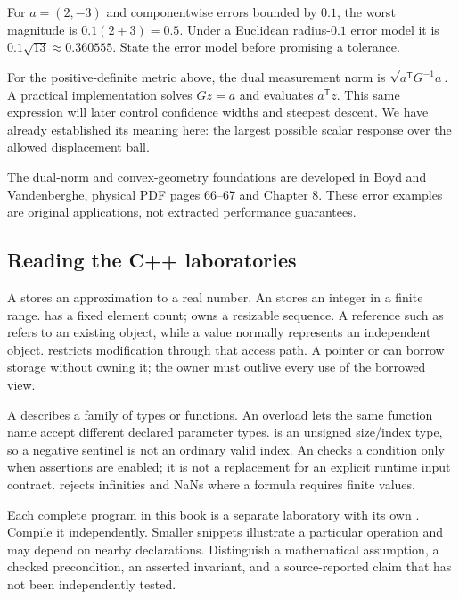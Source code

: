 For \(a=(2,-3)\) and componentwise errors bounded by \(0.1\), the worst magnitude is \(0.1(2+3)=0.5\). Under a Euclidean radius-\(0.1\) error model it is \(0.1\sqrt{13}\approx0.360555\). State the error model before promising a tolerance.

For the positive-definite metric above, the dual measurement norm is \(\sqrt{a^{\mathsf T}G^{-1}a}\). A practical implementation solves \(Gz=a\) and evaluates \(a^{\mathsf T}z\). This same expression will later control confidence widths and steepest descent. We have already established its meaning here: the largest possible scalar response over the allowed displacement ball.

The dual-norm and convex-geometry foundations are developed in Boyd and Vandenberghe, physical PDF pages 66--67 and Chapter 8. These error examples are original applications, not extracted performance guarantees.

\subsection{Reading the C++ laboratories}\label{01-foundations-i-ch017-reading-the-c-laboratories}

\hypertarget{01-foundations-i-ch017-reading-the-c-laboratories}{}

A  stores an approximation to a real number. An  stores an integer in a finite range.  has a fixed element count;  owns a resizable sequence. A reference such as  refers to an existing object, while a value normally represents an independent object.  restricts modification through that access path. A pointer or  can borrow storage without owning it; the owner must outlive every use of the borrowed view.

A  describes a family of types or functions. An overload lets the same function name accept different declared parameter types.  is an unsigned size/index type, so a negative sentinel is not an ordinary valid index. An  checks a condition only when assertions are enabled; it is not a replacement for an explicit runtime input contract.  rejects infinities and NaNs where a formula requires finite values.

Each complete program in this book is a separate laboratory with its own . Compile it independently. Smaller snippets illustrate a particular operation and may depend on nearby declarations. Distinguish a mathematical assumption, a checked precondition, an asserted invariant, and a source-reported claim that has not been independently tested.

